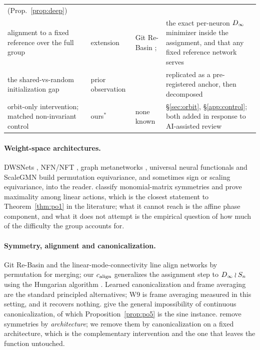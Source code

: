 \begin{table}[t]
\begin{tabular}{@{}L{3.4cm}L{2.0cm}L{5.4cm}L{5.6cm}@{}}
   (Prop.~\ref{prop:deep}) \\
\addlinespace[2pt]
alignment to a fixed reference over the full group
 & extension
 & Git Re-Basin \citep{ainsworth2023rebasin}; \citet{entezari2022lmc}
 & the exact per-neuron $D_\infty$ minimizer inside the assignment, and that any fixed reference
   network serves \\
\addlinespace[2pt]
the shared-vs-random initialization gap
 & prior observation
 & \citet{deluigi2023inr2vec,papa2024howtotrain}
 & replicated as a pre-registered anchor, then decomposed \\
\addlinespace[2pt]
orbit-only intervention; matched non-invariant control
 & ours$^\ast$
 & none known
  & \S\ref{sec:orbit}, \S\ref{app:control}; both added in response to AI-assisted review \\
\bottomrule
\end{tabular}
\end{table}

\paragraph{Weight-space architectures.} DWSNets \citep{navon2023dws}, NFN/NFT
\citep{zhou2023nfn,zhou2023nft}, graph metanetworks \citep{lim2024gmn,kofinas2024graph},
universal neural functionals \citep{zhou2024unf} and ScaleGMN \citep{kalogeropoulos2024scalegmn}
build permutation equivariance, and sometimes sign or scaling equivariance, into the reader.
\citet{tran2024monomial} classify monomial-matrix symmetries and prove maximality among linear
actions, which is the closest statement to Theorem~\ref{thm:po1} in the literature; what it cannot
reach is the affine phase component, and what it does not attempt is the empirical question of how
much of the difficulty the group accounts for.

\paragraph{Symmetry, alignment and canonicalization.} Git Re-Basin \citep{ainsworth2023rebasin}
and the linear-mode-connectivity line \citep{entezari2022lmc} align networks by permutation for
merging; our $c_{\mathrm{align}}$ generalizes the assignment step to $D_\infty \wr S_n$ using the Hungarian
algorithm \citep{kuhn1955hungarian}. Learned canonicalization \citep{kaba2023canonicalization} and
frame averaging \citep{puny2022frame} are the standard principled alternatives; W9 is frame
averaging measured in this setting, and it recovers nothing. \citet{dym2024impossibility} give the
general impossibility of continuous canonicalization, of which Proposition~\ref{prop:po5} is the
sine instance. \citet{lim2024empirical} remove symmetries by \emph{architecture}; we remove them
by canonicalization on a fixed architecture, which is the complementary intervention and the one
that leaves the function untouched.

